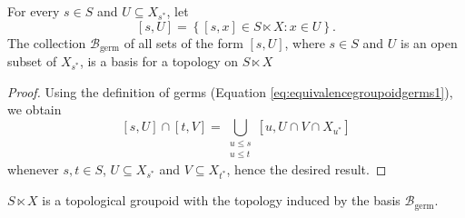 \begin{lemma}\label{lemmatopologygroupoidgerms}
For every $s\in S$ and $U\subseteq X_{s^*}$, let
\[[s,U]=\left\lbrace[s, x]\in S\ltimes X : x\in U\right\rbrace.\]
The collection $\mathcal{B}_{\mathrm{germ}}$ of all sets of the form $[s,U]$, where $s\in S$ and $U$ is an open subset of $X_{s^*}$, is a basis for a topology on $S\ltimes X$%
\end{lemma}
\begin{proof}
Using the definition of germs (Equation \ref{eq:equivalencegroupoidgerms1}), we obtain
\[[s,U]\cap [t,V]=\bigcup_{\substack{u\leq s\\u\leq t}}[u,U\cap V\cap X_{u^*}]\]
whenever $s,t\in S$, $U\subseteq X_{s^*}$ and $V\subseteq X_{t^*}$, hence the desired result.\qedhere
%
\end{proof}

\begin{proposition}\label{propositiongroupoidofgermsistopological}
$S\ltimes X$ is a topological groupoid with the topology induced by the basis $\mathcal{B}_{\mathrm{germ}}$.
\end{proposition}

